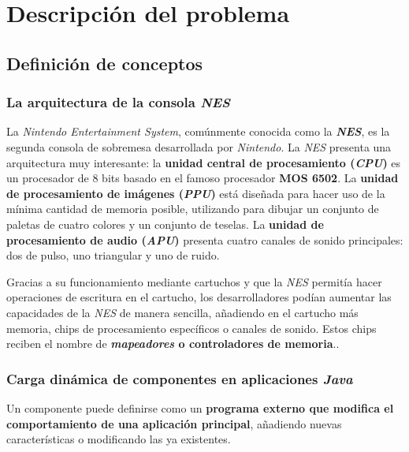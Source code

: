 \chapter{Descripción del problema} \label{ch:descripcion-del-problema}


\section{Definición de conceptos}\label{sec:definicion-de-conceptos}

\subsection{La arquitectura de la consola \textit{NES}}\label{subsec:la-arquitectura-mips}

La \textit{Nintendo Entertainment System}\cite{NES}, comúnmente conocida como
la \textbf{\textit{NES}}, es la segunda consola de sobremesa desarrollada por
\textit{Nintendo}.
La \textit{NES} presenta una arquitectura muy interesante:
la \textbf{unidad central de procesamiento (\textit{CPU})} es un procesador
de 8 bits basado en el famoso procesador \textbf{MOS 6502}\cite{MOS6502}.
La \textbf{unidad de procesamiento de imágenes (\textit{PPU})}\cite{PPU} está
diseñada para hacer uso de la mínima cantidad de memoria posible, utilizando para
dibujar un conjunto de paletas de cuatro colores y un conjunto de teselas.
La \textbf{unidad de procesamiento de audio (\textit{APU})}\cite{APU} presenta
cuatro canales de sonido principales: dos de pulso, uno triangular
y uno de ruido.

Gracias a su funcionamiento mediante cartuchos y que la
\textit{NES} permitía hacer operaciones de escritura en el cartucho,
los desarrolladores podían aumentar las capacidades de la \textit{NES} de manera sencilla,
añadiendo en el cartucho más memoria, chips de procesamiento específicos
o canales de sonido.
Estos chips reciben el nombre de \textbf{\textit{mapeadores}
o controladores de memoria}.\cite{MAPPERS}.

\subsection{Carga dinámica de componentes en aplicaciones \textit{Java}}
\label{subsec:carga-dinamica-de-componentes-en-aplicaciones-java}

Un componente puede definirse como un \textbf{programa externo que modifica
el comportamiento de una aplicación principal}, añadiendo nuevas
características o modificando las ya existentes.

